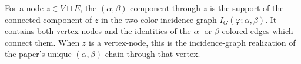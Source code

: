 \begin{definition}
For a node $z\in V\sqcup E$, the $(\alpha,\beta)$-component through $z$ is
the support of the connected component of $z$ in the two-color incidence
graph $I_G(\varphi;\alpha,\beta)$.  It contains both vertex-nodes and the
identities of the $\alpha$- or $\beta$-colored edges which connect them.
When $z$ is a vertex-node, this is the incidence-graph realization of the
paper's unique $(\alpha,\beta)$-chain through that vertex.
\end{definition}
